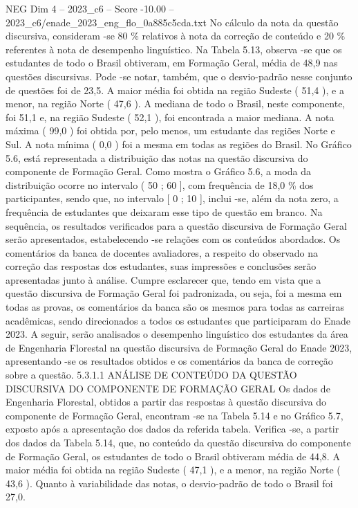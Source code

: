 \begin{textsample}{NEG Dim 4 – 2023\_c6 – Score -10.00 – 2023\_c6/enade\_2023\_eng\_flo\_0a885c5cda.txt}
No cálculo da nota da questão discursiva, consideram -se 80 \% relativos à nota da correção de conteúdo e 20 \% referentes à nota de desempenho linguístico.
Na Tabela 5.13, observa -se que os estudantes de todo o Brasil obtiveram, em Formação Geral, média de 48,9 nas questões discursivas.
Pode -se notar, também, que o desvio-padrão nesse conjunto de questões foi de 23,5.
A maior média foi obtida na região Sudeste ( 51,4 ), e a menor, na região Norte ( 47,6 ).
A mediana de todo o Brasil, neste componente, foi 51,1 e, na região Sudeste ( 52,1 ), foi encontrada a maior mediana.
A nota máxima ( 99,0 ) foi obtida por, pelo menos, um estudante das regiões Norte e Sul.
A nota mínima ( 0,0 ) foi a mesma em todas as regiões do Brasil.
No Gráfico 5.6, está representada a distribuição das notas na questão discursiva do componente de Formação Geral.
Como mostra o Gráfico 5.6, a moda da distribuição ocorre no intervalo ( 50 ; 60 ], com frequência de 18,0 \% dos participantes, sendo que, no intervalo [ 0 ; 10 ], inclui -se, além da nota zero, a frequência de estudantes que deixaram esse tipo de questão em branco.
Na sequência, os resultados verificados para a questão discursiva de Formação Geral serão apresentados, estabelecendo -se relações com os conteúdos abordados.
Os comentários da banca de docentes avaliadores, a respeito do observado na correção das respostas dos estudantes, suas impressões e conclusões serão apresentadas junto à análise.
Cumpre esclarecer que, tendo em vista que a questão discursiva de Formação Geral foi padronizada, ou seja, foi a mesma em todas as provas, os comentários da banca são os mesmos para todas as carreiras acadêmicas, sendo direcionados a todos os estudantes que participaram do Enade 2023.
A seguir, serão analisados o desempenho linguístico dos estudantes da área de Engenharia Florestal na questão discursiva de Formação Geral do Enade 2023, apresentando -se os resultados obtidos e os comentários da banca de correção sobre a questão. 5.3.1.1 ANÁLISE DE CONTEÚDO DA QUESTÃO DISCURSIVA DO COMPONENTE DE FORMAÇÃO GERAL Os dados de Engenharia Florestal, obtidos a partir das respostas à questão discursiva do componente de Formação Geral, encontram -se na Tabela 5.14 e no Gráfico 5.7, exposto após a apresentação dos dados da referida tabela.
Verifica -se, a partir dos dados da Tabela 5.14, que, no conteúdo da questão discursiva do componente de Formação Geral, os estudantes de todo o Brasil obtiveram média de 44,8.
A maior média foi obtida na região Sudeste ( 47,1 ), e a menor, na região Norte ( 43,6 ).
Quanto à variabilidade das notas, o desvio-padrão de todo o Brasil foi 27,0.

\end{textsample}
